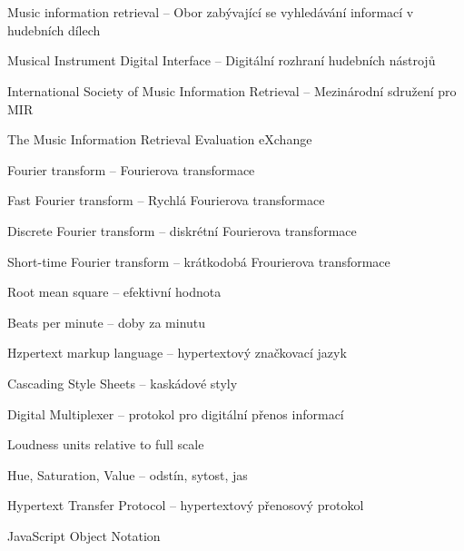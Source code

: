 \cleardoublepage
\chapter*{\listofabbrevname}
{}

\begin{acronym}[KolikMista]
		{Music information retrieval -- Obor zabývající se vyhledávání informací v hudebních dílech}
	
		{Musical Instrument Digital Interface -- Digitální rozhraní hudebních nástrojů}

		{International Society of Music Information Retrieval -- Mezinárodní sdružení pro \acs*{MIR}}	

		{The Music Information Retrieval Evaluation eXchange}

		{Fourier transform -- Fourierova transformace}
		
		{Fast Fourier transform -- Rychlá Fourierova transformace}

		{Discrete Fourier transform -- diskrétní Fourierova transformace}

		{Short-time Fourier transform -- krátkodobá Frourierova transformace}
	
		{Root mean square -- efektivní hodnota}

		{Beats per minute -- doby za minutu}

		{Hzpertext markup language --  hypertextový značkovací jazyk}

	{Cascading Style Sheets -- kaskádové styly}

		{Digital Multiplexer -- protokol pro digitální přenos informací}
	
		{Loudness units relative to full scale}
	
		{Hue, Saturation, Value -- odstín, sytost, jas}

		{Hypertext Transfer Protocol -- hypertextový přenosový protokol}

	{JavaScript Object Notation}
\end{acronym}

